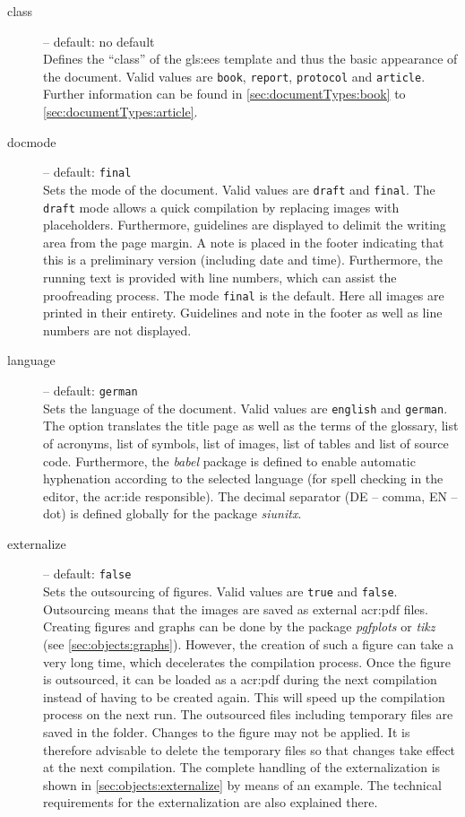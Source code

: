 \vfill

\begin{description}
	\item[class] -- default: no default \\
	Defines the \enquote{class} of the \gls{gls:ees} template and thus the basic appearance of the document. Valid values are \texttt{book}, \texttt{report}, \texttt{protocol} and \texttt{article}. Further information can be found in \autoref{sec:documentTypes:book} to \autoref{sec:documentTypes:article}.
	
	\item[docmode] -- default: \texttt{final} \\
	Sets the mode of the document. Valid values are \texttt{draft} and \texttt{final}. The \texttt{draft} mode allows a quick compilation by replacing images with placeholders. Furthermore, guidelines are displayed to delimit the writing area from the page margin. A note is placed in the footer indicating that this is a preliminary version (including date and time). Furthermore, the running text is provided with line numbers, which can assist the proofreading process. The mode \texttt{final} is the default. Here all images are printed in their entirety. Guidelines and note in the footer as well as line numbers are not displayed.
	
	\item[language] -- default: \texttt{german} \\
	Sets the language of the document. Valid values are \texttt{english} and \texttt{german}. The option translates the title page as well as the terms of the glossary, list of acronyms, list of symbols, list of images, list of tables and list of source code. Furthermore, the \textit{babel} package is defined to enable automatic hyphenation according to the selected language (for spell checking in the editor, the \ac{acr:ide} responsible). The decimal separator (DE -- comma, EN -- dot) is defined globally for the package \textit{siunitx}.
	
	\item[externalize] -- default: \texttt{false} \\
	Sets the outsourcing of figures. Valid values are \texttt{true} and \texttt{false}. Outsourcing means that the images are saved as external \ac{acr:pdf} files. Creating figures and graphs can be done by the package \textit{pgfplots} or \textit{tikz} (see \autoref{sec:objects:graphs}). However, the creation of such a figure can take a very long time, which decelerates the compilation process. Once the figure is outsourced, it can be loaded as a \ac{acr:pdf} during the next compilation instead of having to be created again. This will speed up the compilation process on the next run. The outsourced files including temporary files are saved in the \tikzdir folder. Changes to the figure may not be applied. It is therefore advisable to delete the temporary files so that changes take effect at the next compilation. The complete handling of the externalization is shown in \autoref{sec:objects:externalize} by means of an example. The technical requirements for the externalization are also explained there.
	

\end{description}
